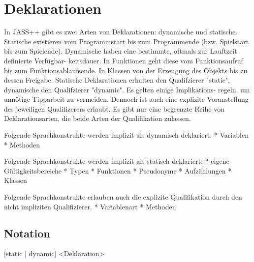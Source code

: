 \chapter{Deklarationen}

In JASS++ gibt es zwei Arten von Deklarationen: dynamische und statische. Statische existieren vom Programmstart bis zum
Programmende (bzw. Spielstart bis zum Spielende). Dynamische haben eine bestimmte, oftmals zur Lauftzeit definierte Verfügbar-
keitsdauer.
In Funktionen geht diese vom Funktionsaufruf bis zum Funktionsablaufsende. In Klassen von der Erzeugung des Objekts bis zu
dessen Freigabe.
Statische Deklarationen erhalten den Qualifzierer "static", dynamische den Qualifzierer "dynamic". Es gelten einige Implikations-
regeln, um unnötige Tipparbeit zu vermeiden. Dennoch ist auch eine explizite Voranstellung des jeweiligen Qualifizerers erlaubt.
Es gibt nur eine begrenzte Reihe von Deklarationsarten, die beide Arten der Qualifikation zulassen.

Folgende Sprachkonstrukte werden implizit als dynamisch deklariert:
* Variablen
* Methoden

Folgende Sprachkonstrukte werden implizit als statisch deklariert:
* eigene Gültigkeitsbereiche
* Typen
* Funktionen
* Pseudonyme
* Aufzählungen
* Klassen

Folgende Sprachkonstrukte erlauben auch die explizite Qualifikation durch den nicht impliziten Qualifizierer.
* Variablenart
* Methoden

\section { Notation }
[static | dynamic] <Deklaration> 
